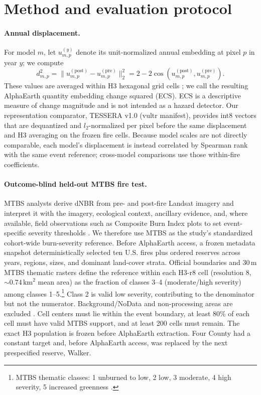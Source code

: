 \documentclass{article}
\begin{document}
\section{Method and evaluation protocol}

\paragraph{Annual displacement.}
For model $m$, let $u_{m,p}^{(y)}$ denote its unit-normalized annual embedding
at pixel $p$ in year $y$; we compute
\[
d_{m,p}^2=\lVert u_{m,p}^{(\mathrm{post})}
-u_{m,p}^{(\mathrm{pre})}\rVert_2^2
=2-2\cos(u_{m,p}^{(\mathrm{post})},u_{m,p}^{(\mathrm{pre})}).
\]
These values are averaged within H3 hexagonal grid cells \citep{h3spec}; we
call the resulting AlphaEarth quantity embedding change squared (ECS). ECS is
a descriptive measure of change magnitude and is not intended as a hazard
detector. Our representation comparator, TESSERA v1.0 (vultr manifest),
provides int8 vectors that are dequantized and $l_2$-normalized per pixel
before the same displacement and H3 averaging on the frozen fire cells.
Because model scales are not directly comparable, each model's displacement
is instead correlated by Spearman rank with the same event reference;
cross-model comparisons use those within-fire coefficients.

\paragraph{Outcome-blind held-out MTBS fire test.}
MTBS analysts derive dNBR from pre- and post-fire Landsat imagery and interpret
it with the imagery, ecological context, ancillary evidence, and, where
available, field observations such as Composite Burn Index plots to set
event-specific severity thresholds
\citep{eidenshink2007mtbs,picotte2020mtbs}. We therefore use MTBS as the
study's standardized cohort-wide burn-severity reference. Before AlphaEarth
access, a frozen metadata snapshot deterministically selected ten U.S. fires
plus ordered reserves across years, regions, sizes, and dominant land-cover
strata. Official boundaries and 30\,m MTBS thematic rasters define the
reference within each H3-r8 cell (resolution 8, ${\sim}0.74\,\mathrm{km}^2$
mean area) as the fraction of classes 3--4 (moderate/high severity) among
classes 1--5.\footnote{MTBS thematic classes: 1 unburned to low, 2 low,
3 moderate, 4 high severity, 5 increased greenness
\citep{eidenshink2007mtbs}.} Class 2 is valid low severity, contributing to
the denominator but not the numerator. Background/NoData and non-processing
areas are excluded \citep{eidenshink2007mtbs}. Cell centers must lie within
the event boundary, at least 80\% of each cell must have valid MTBS support,
and at least 200 cells must remain. The exact H3 population is frozen before
AlphaEarth extraction. Four County had a constant target and, before
AlphaEarth access, was replaced by the next prespecified reserve, Walker.
\end{document}
